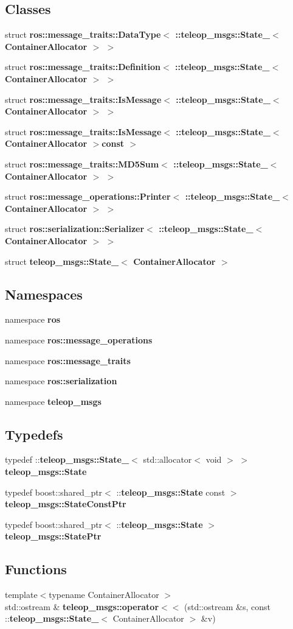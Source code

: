 \subsection*{Classes}
\begin{DoxyCompactItemize}
\item 
struct {\bf ros::message\_\-traits::DataType$<$ ::teleop\_\-msgs::State\_\-$<$ ContainerAllocator $>$ $>$}
\item 
struct {\bf ros::message\_\-traits::Definition$<$ ::teleop\_\-msgs::State\_\-$<$ ContainerAllocator $>$ $>$}
\item 
struct {\bf ros::message\_\-traits::IsMessage$<$ ::teleop\_\-msgs::State\_\-$<$ ContainerAllocator $>$ $>$}
\item 
struct {\bf ros::message\_\-traits::IsMessage$<$ ::teleop\_\-msgs::State\_\-$<$ ContainerAllocator $>$const  $>$}
\item 
struct {\bf ros::message\_\-traits::MD5Sum$<$ ::teleop\_\-msgs::State\_\-$<$ ContainerAllocator $>$ $>$}
\item 
struct {\bf ros::message\_\-operations::Printer$<$ ::teleop\_\-msgs::State\_\-$<$ ContainerAllocator $>$ $>$}
\item 
struct {\bf ros::serialization::Serializer$<$ ::teleop\_\-msgs::State\_\-$<$ ContainerAllocator $>$ $>$}
\item 
struct {\bf teleop\_\-msgs::State\_\-$<$ ContainerAllocator $>$}
\end{DoxyCompactItemize}
\subsection*{Namespaces}
\begin{DoxyCompactItemize}
\item 
namespace {\bf ros}
\item 
namespace {\bf ros::message\_\-operations}
\item 
namespace {\bf ros::message\_\-traits}
\item 
namespace {\bf ros::serialization}
\item 
namespace {\bf teleop\_\-msgs}
\end{DoxyCompactItemize}
\subsection*{Typedefs}
\begin{DoxyCompactItemize}
\item 
typedef ::{\bf teleop\_\-msgs::State\_\-}$<$ std::allocator$<$ void $>$ $>$ {\bf teleop\_\-msgs::State}
\item 
typedef boost::shared\_\-ptr$<$ ::{\bf teleop\_\-msgs::State} const  $>$ {\bf teleop\_\-msgs::StateConstPtr}
\item 
typedef boost::shared\_\-ptr$<$ ::{\bf teleop\_\-msgs::State} $>$ {\bf teleop\_\-msgs::StatePtr}
\end{DoxyCompactItemize}
\subsection*{Functions}
\begin{DoxyCompactItemize}
\item 
{\footnotesize template$<$typename ContainerAllocator $>$ }\\std::ostream \& {\bf teleop\_\-msgs::operator$<$$<$} (std::ostream \&s, const ::{\bf teleop\_\-msgs::State\_\-}$<$ ContainerAllocator $>$ \&v)
\end{DoxyCompactItemize}
